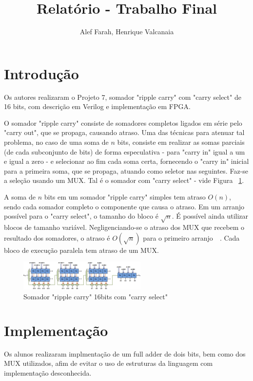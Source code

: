 \documentclass[12pt]{article}
\title{Relatório - Trabalho Final}
\author{
  Alef Farah,
  Henrique Valcanaia
}
\newcommand\spacecite{\penalty700\ \cite}
\begin{document}
\maketitle

\section{Introdução}

Os autores realizaram o Projeto 7, somador "ripple carry" com "carry select" de
16 bits, com descrição em Verilog e implementação em FPGA.

O somador "ripple carry" consiste de somadores completos ligados em série pelo
"carry out", que se propaga, causando atraso. Uma das técnicas para atenuar tal
problema, no caso de uma soma de $n$ bits, consiste em realizar as somas
parciais (de cada subconjunto de bits) de forma especulativa - para "carry in"
igual a um e igual a zero - e selecionar ao fim cada soma certa, fornecendo o
"carry in" inicial para a primeira soma, que se propaga, atuando como seletor
nas seguintes. Faz-se a seleção usando um MUX. Tal é o somador com "carry
select" - vide Figura ~\ref{fig:select}.

A soma de $n$ bits em um somador "ripple carry" simples tem atraso $O(n)$,
sendo cada somador completo o componente que causa o atraso. Em um arranjo
possível para o "carry select", o tamanho do bloco é $\sqrt{n}$. É possível
ainda utilizar blocos de tamanho variável.  Negligenciando-se o atraso dos MUX
que recebem o resultado dos somadores, o atraso é $O(\sqrt{n})$ para o primeiro
arranjo~\spacecite{amelifard2005closing}. Cada bloco de execução paralela tem
atraso de um MUX.

\begin{figure}[H]
  \centering
  \includegraphics[width=2.5in]{select.png}
  \caption{Somador "ripple carry" 16bits com "carry select"}
  \label{fig:select}
\end{figure}

\section{Implementação}

Os alunos realizaram implmentação de um full adder de dois bits, bem como dos
MUX utilizados, afim de evitar o uso de estruturas da linguagem com 
implementação desconhecida.
\end{document}
